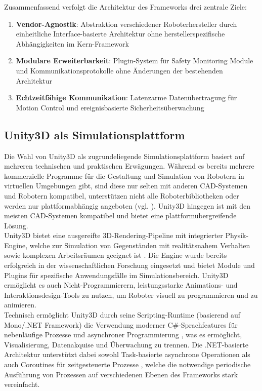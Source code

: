 \noindent
Zusammenfassend verfolgt die Architektur des Frameworks drei zentrale Ziele:
\begin{enumerate}
	\item \textbf{Vendor-Agnostik}: Abstraktion verschiedener Roboterhersteller durch einheitliche Interface-basierte Architektur ohne herstellerspezifische Abhängigkeiten im Kern-Framework

	\item \textbf{Modulare Erweiterbarkeit}: Plugin-System für Safety Monitoring Module und Kommunikationsprotokolle ohne Änderungen der bestehenden Architektur

	\item \textbf{Echtzeitfähige Kommunikation}: Latenzarme Datenübertragung für Motion Control und ereignisbasierte Sicherheitsüberwachung
\end{enumerate}

\subsection{Unity3D als Simulationsplattform}

Die Wahl von Unity3D als zugrundeliegende Simulationsplattform basiert auf
mehreren technischen und praktischen Erwägungen. Während es bereits mehrere
kommerzielle Programme für die Gestaltung und Simulation von Robotern in
virtuellen Umgebungen gibt, sind diese nur selten mit anderen CAD-Systemen und
Robotern kompatibel, unterstützen nicht alle Roboterbibliotheken oder werden
nur plattformabhängig angeboten (vgl. ). Unity3D
hingegen ist mit den meisten CAD-Systemen kompatibel und bietet eine
plattformübergreifende Lösung.\\

\noindent
Unity3D bietet eine ausgereifte 3D-Rendering-Pipeline mit integrierter
Physik-Engine, welche zur Simulation von Gegenständen mit realitätsnahem
Verhalten sowie komplexen Arbeitsräumen geeignet ist .
Die Engine wurde bereits erfolgreich in der wissenschaftlichen Forschung
eingesetzt und bietet Module und Plugins für spezifische Anwendungsfälle im
Simulationsbereich. Unity3D ermöglicht es auch Nicht-Programmierern,
leistungsstarke Animations- und Interaktionsdesign-Tools zu nutzen, um Roboter
visuell zu programmieren und zu animieren.\\

\noindent
Technisch ermöglicht Unity3D durch seine Scripting-Runtime (basierend auf
Mono/.NET Framework) die Verwendung moderner C\#-Sprachfeatures für
nebenläufige Prozesse und asynchroner Programmierung
, was es ermöglicht, Visualisierung,
Datenakquise und Überwachung zu trennen. Die .NET-basierte Architektur
unterstützt dabei sowohl Task-basierte asynchrone Operationen als auch
Coroutines für zeitgesteuerte Prozesse
, welche die notwendige periodische
Ausführung von Prozessen auf verschiedenen Ebenen des Frameworks stark
vereinfacht.\\

